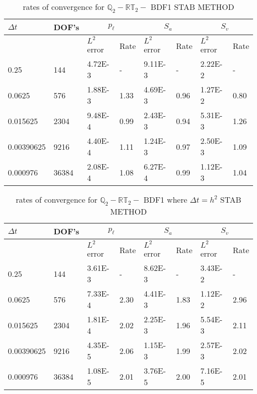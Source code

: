 \begin{table}[ht]
	\centering
	\begin{tabular}{|l|l|l||l|l||l|l|l|}
		\hline
		$\Delta t$ & DOF's & \multicolumn{2}{c|}{$p_{\ell}$} & \multicolumn{2}{c|}{$S_a$} & \multicolumn{2}{c|}{$S_v$}  \\ \hline
		& & $L^2$ error & Rate & $L^2$ error & Rate & $L^2$ error & Rate \\ \hline
		0.25   	  & 144   & 4.72E-3 & -	   & 9.11E-3 & -    & 2.22E-2 & - \\ \hline
		0.0625    & 576   & 1.88E-3 & 1.33 & 4.69E-3 & 0.96 & 1.27E-2 & 0.80 \\ \hline
		0.015625  & 2304  & 9.48E-4 & 0.99 & 2.43E-3 & 0.94 & 5.31E-3 & 1.26 \\ \hline
		0.00390625& 9216  & 4.40E-4 & 1.11 & 1.24E-3 & 0.97 & 2.50E-3 & 1.09 \\ \hline 
		0.000976  & 36384 & 2.08E-4 & 1.08 & 6.27E-4 & 0.99 & 1.12E-3 & 1.04  \\ \hline
	\end{tabular}
	\caption[Template table-description for list of tables.]{ rates of convergence for $\mathbb{Q}_2 - \mathbb{RT}_2-$ BDF1  STAB METHOD }
\end{table}

\begin{table}[ht]
	\centering
	\begin{tabular}{|l|l|l||l|l||l|l|l|}
		\hline
		$\Delta t$ & DOF's & \multicolumn{2}{c|}{$p_{\ell}$} & \multicolumn{2}{c|}{$S_a$} & \multicolumn{2}{c|}{$S_v$}  \\ \hline
		& & $L^2$ error & Rate & $L^2$ error & Rate & $L^2$ error & Rate \\ \hline
		0.25   	  & 144   & 3.61E-3 & -	   & 8.62E-3 & -    & 3.43E-2 & - \\ \hline
		0.0625    & 576   & 7.33E-4 & 2.30 & 4.41E-3 & 1.83 & 1.12E-2 & 2.96 \\ \hline
		0.015625  & 2304  & 1.81E-4 & 2.02 & 2.25E-3 & 1.96 & 5.54E-3 & 2.11 \\ \hline
		0.00390625& 9216  & 4.35E-5 & 2.06 & 1.15E-3 & 1.99 & 2.57E-3 & 2.02 \\ \hline 
		0.000976  & 36384 & 1.08E-5 & 2.01 & 3.76E-5 & 2.00 & 7.16E-5 & 2.01  \\ \hline
	\end{tabular}
	\caption[Template table-description for list of tables.]{ rates of convergence for $\mathbb{Q}_2 - \mathbb{RT}_2-$ BDF1 where $\Delta t = h^2$  STAB METHOD }
\end{table}

